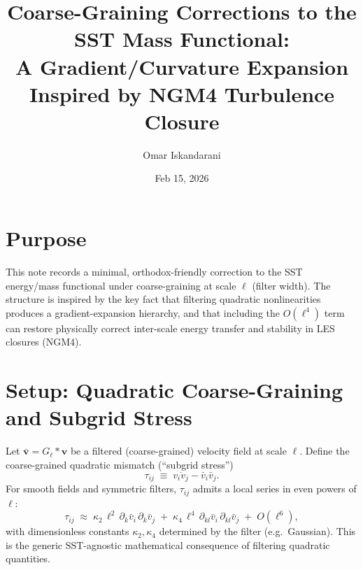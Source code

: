 \documentclass[11pt]{article}
\title{Coarse-Graining Corrections to the SST Mass Functional:\\
A Gradient/Curvature Expansion Inspired by NGM4 Turbulence Closure}
\author{Omar Iskandarani}
\date{Feb 15, 2026}
\begin{document}
\maketitle

\section{Purpose}
This note records a minimal, orthodox-friendly correction to the SST energy/mass functional under coarse-graining at scale $\ell$ (filter width). The structure is inspired by the key fact that filtering quadratic nonlinearities produces a gradient-expansion hierarchy, and that including the $O(\ell^4)$ term can restore physically correct inter-scale energy transfer and stability in LES closures (NGM4).

\section{Setup: Quadratic Coarse-Graining and Subgrid Stress}
Let $\bar{\mathbf{v}} = G_\ell * \mathbf{v}$ be a filtered (coarse-grained) velocity field at scale $\ell$. Define the coarse-grained quadratic mismatch (``subgrid stress'')
\begin{equation}
\tau_{ij} \;\equiv\; \overline{v_i v_j} - \bar v_i \bar v_j.
\end{equation}
For smooth fields and symmetric filters, $\tau_{ij}$ admits a local series in even powers of $\ell$:
\begin{equation}
\tau_{ij} \;\approx\; \kappa_2\,\ell^2\,\partial_k \bar v_i\,\partial_k \bar v_j
\;+\;
\kappa_4\,\ell^4\,\partial_{kl} \bar v_i\,\partial_{kl} \bar v_j
\;+\; O(\ell^6),
\label{eq:tau_expansion}
\end{equation}
with dimensionless constants $\kappa_2,\kappa_4$ determined by the filter (e.g.\ Gaussian). This is the generic SST-agnostic mathematical consequence of filtering quadratic quantities.
\end{document}
